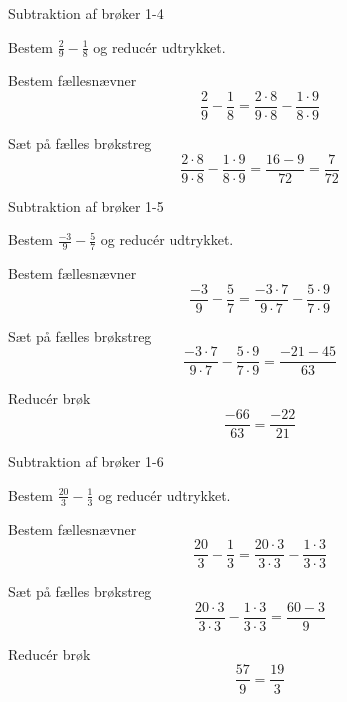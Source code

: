 \documentclass{article}
\begin{document}
	\newpage
	
	\begin{exercise}{Subtraktion af brøker 1-4}
		
		Bestem $\frac{2}{9}-\frac{1}{8}$ og reducér udtrykket.
		
		
		\hint
		
		Bestem fællesnævner
		\[
		\frac{2}{9}-\frac{1}{8}  = \frac{2 \cdot 8}{9 \cdot 8}-\frac{1 \cdot 9}{8\cdot 9} 
		\]
		
		\hint
		
		Sæt på fælles brøkstreg
		\[
		\frac{2 \cdot 8}{9 \cdot 8}-\frac{1 \cdot 9}{8\cdot 9}    = \frac{16-9}{72}  = \frac{7}{72}
		\]
		
		
	\end{exercise}
	
	\newpage
	
	\begin{exercise}{Subtraktion af brøker 1-5}
		
		Bestem $\frac{-3}{9}-\frac{5}{7}$ og reducér udtrykket.
		
		
		\hint
		
		Bestem fællesnævner
		\[
		\frac{-3}{9}-\frac{5}{7}  = \frac{-3 \cdot 7}{9 \cdot 7}-\frac{5 \cdot 9}{7 \cdot 9} 
		\]
		
		\hint
		
		Sæt på fælles brøkstreg
		\[
		\frac{-3 \cdot 7}{9 \cdot 7}-\frac{5 \cdot 9}{7 \cdot 9}     = \frac{-21-45}{63} 
		\]
		
		\hint
		
		Reducér brøk
		\[
		\frac{-66}{63} = \frac{-22}{21}
		\]
		
	\end{exercise}
	
	\newpage
	
	\begin{exercise}{Subtraktion af brøker 1-6}
		
		Bestem $\frac{20}{3}-\frac{1}{3}$ og reducér udtrykket.
		
		
		\hint
		
		Bestem fællesnævner
		\[
		\frac{20}{3}-\frac{1}{3}  = \frac{20 \cdot 3}{3 \cdot 3}-\frac{1 \cdot 3}{3 \cdot 3} 
		\]
		
		\hint
		
		Sæt på fælles brøkstreg
		\[
		\frac{20 \cdot 3}{3 \cdot 3}-\frac{1 \cdot 3}{3 \cdot 3}   = \frac{60-3}{9} 
		\]
		
		\hint
		
		Reducér brøk
		\[
		\frac{57}{9} = \frac{19}{3}
		\]
		
	\end{exercise}
\end{document}
